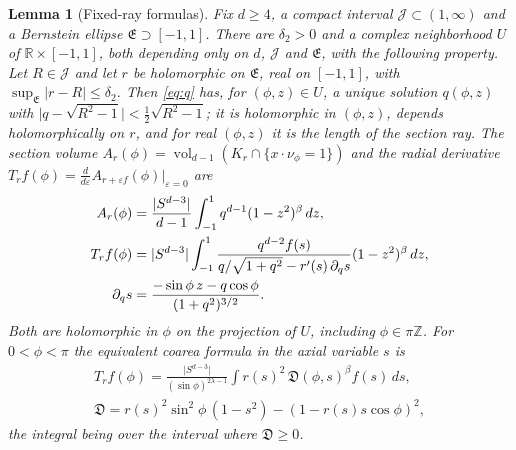 \documentclass[11pt]{amsart}
\numberwithin{equation}{section}
\newtheorem{lemma}[theorem]{Lemma}
\theoremstyle{definition}
\theoremstyle{remark}
\newcommand{\R}{\mathbb{R}}
\newcommand{\Z}{\mathbb{Z}}
\newcommand{\eps}{\varepsilon}
\newcommand{\abs}[1]{\lvert #1\rvert}
\newcommand{\vol}{\operatorname{vol}}
\newcommand{\Disc}{\mathfrak D}
\begin{document}
\begin{lemma}[Fixed-ray formulas]\label{lem:fixedray}
Fix $d\ge4$, a compact interval $\mathcal J\subset(1,\infty)$ and a Bernstein ellipse $\mathfrak E\supset[-1,1]$. There are $\delta_2>0$ and a complex neighborhood $U$ of $\R\times[-1,1]$, both depending only on $d$, $\mathcal J$ and $\mathfrak E$, with the following property. Let $R\in\mathcal J$ and let $r$ be holomorphic on $\mathfrak E$, real on $[-1,1]$, with $\sup_{\mathfrak E}\abs{r-R}\le\delta_2$. Then \eqref{eq:q} has, for $(\phi,z)\in U$, a unique solution $q(\phi,z)$ with $\abs{q-\sqrt{R^2-1}}<\frac12\sqrt{R^2-1}$; it is holomorphic in $(\phi,z)$, depends holomorphically on $r$, and for real $(\phi,z)$ it is the length of the section ray. The section volume $A_r(\phi)=\vol_{d-1}(K_r\cap\{x\cdot\nu_\phi=1\})$ and the radial derivative $T_rf(\phi)=\frac d{d\eps}A_{r+\eps f}(\phi)\bigr|_{\eps=0}$ are
\begin{align}
A_r(\phi)&=\frac{\abs{S^{d-3}}}{d-1}\int_{-1}^1q^{d-1}(1-z^2)^\beta\,dz,\notag\\
T_rf(\phi)&=\abs{S^{d-3}}\int_{-1}^1\frac{q^{d-2}f(s)}{q/\sqrt{1+q^2}-r'(s)\,\partial_qs}(1-z^2)^\beta\,dz,\label{eq:Tr}\\
\partial_qs&=\frac{-\sin\phi\,z-q\cos\phi}{(1+q^2)^{3/2}}.\notag
\end{align}
Both are holomorphic in $\phi$ on the projection of $U$, including $\phi\in\pi\Z$. For $0<\phi<\pi$ the equivalent coarea formula in the axial variable $s$ is
\begin{equation}\label{eq:coarea}
\begin{gathered}
T_rf(\phi)=\frac{\abs{S^{d-3}}}{(\sin\phi)^{2\lambda-1}}\int r(s)^2\,\Disc(\phi,s)^\beta f(s)\,ds,\\
\Disc=r(s)^2\sin^2\phi\,(1-s^2)-(1-r(s)s\cos\phi)^2 ,
\end{gathered}
\end{equation}
the integral being over the interval where $\Disc\ge0$.
\end{lemma}
\end{document}

